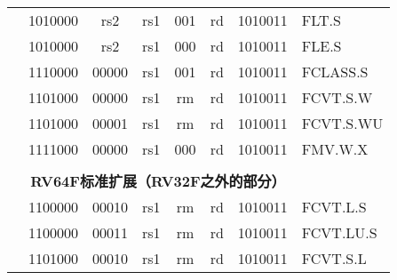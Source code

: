 \begin{table}[p]
\begin{small}
\begin{center}
\begin{tabular}{p{0in}p{0.4in}p{0.05in}p{0.05in}p{0.05in}p{0.05in}p{0.4in}p{0.6in}p{0.4in}p{0.6in}p{0.7in}l}
&
\multicolumn{4}{|c|}{1010000} &
\multicolumn{2}{c|}{rs2} &
\multicolumn{1}{c|}{rs1} &
\multicolumn{1}{c|}{001} &
\multicolumn{1}{c|}{rd} &
\multicolumn{1}{c|}{1010011} & FLT.S \\
\cline{2-11}


&
\multicolumn{4}{|c|}{1010000} &
\multicolumn{2}{c|}{rs2} &
\multicolumn{1}{c|}{rs1} &
\multicolumn{1}{c|}{000} &
\multicolumn{1}{c|}{rd} &
\multicolumn{1}{c|}{1010011} & FLE.S \\
\cline{2-11}


&
\multicolumn{4}{|c|}{1110000} &
\multicolumn{2}{c|}{00000} &
\multicolumn{1}{c|}{rs1} &
\multicolumn{1}{c|}{001} &
\multicolumn{1}{c|}{rd} &
\multicolumn{1}{c|}{1010011} & FCLASS.S \\
\cline{2-11}


&
\multicolumn{4}{|c|}{1101000} &
\multicolumn{2}{c|}{00000} &
\multicolumn{1}{c|}{rs1} &
\multicolumn{1}{c|}{rm} &
\multicolumn{1}{c|}{rd} &
\multicolumn{1}{c|}{1010011} & FCVT.S.W \\
\cline{2-11}


&
\multicolumn{4}{|c|}{1101000} &
\multicolumn{2}{c|}{00001} &
\multicolumn{1}{c|}{rs1} &
\multicolumn{1}{c|}{rm} &
\multicolumn{1}{c|}{rd} &
\multicolumn{1}{c|}{1010011} & FCVT.S.WU \\
\cline{2-11}


&
\multicolumn{4}{|c|}{1111000} &
\multicolumn{2}{c|}{00000} &
\multicolumn{1}{c|}{rs1} &
\multicolumn{1}{c|}{000} &
\multicolumn{1}{c|}{rd} &
\multicolumn{1}{c|}{1010011} & FMV.W.X \\
\cline{2-11}


&
\multicolumn{10}{c}{} & \\
&
\multicolumn{10}{c}{\bf RV64F标准扩展（RV32F之外的部分）} & \\
\cline{2-11}


&
\multicolumn{4}{|c|}{1100000} &
\multicolumn{2}{c|}{00010} &
\multicolumn{1}{c|}{rs1} &
\multicolumn{1}{c|}{rm} &
\multicolumn{1}{c|}{rd} &
\multicolumn{1}{c|}{1010011} & FCVT.L.S \\
\cline{2-11}


&
\multicolumn{4}{|c|}{1100000} &
\multicolumn{2}{c|}{00011} &
\multicolumn{1}{c|}{rs1} &
\multicolumn{1}{c|}{rm} &
\multicolumn{1}{c|}{rd} &
\multicolumn{1}{c|}{1010011} & FCVT.LU.S \\
\cline{2-11}


&
\multicolumn{4}{|c|}{1101000} &
\multicolumn{2}{c|}{00010} &
\multicolumn{1}{c|}{rs1} &
\multicolumn{1}{c|}{rm} &
\multicolumn{1}{c|}{rd} &
\multicolumn{1}{c|}{1010011} & FCVT.S.L \\
\cline{2-11}



\end{tabular}
\end{center}
\end{small}
\end{table}
